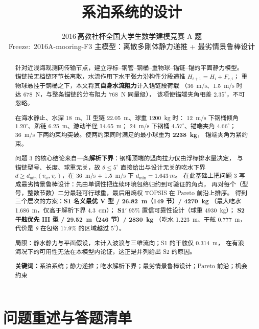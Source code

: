 \documentclass[UTF8,a4paper,zihao=-4]{ctexart}
\title{\textbf{系泊系统的设计}}
\author{
  2016\,高教社杯全国大学生数学建模竞赛 A 题\\[0.4em]
  \small Freeze:~2016A-mooring-F3\quad
  主模型：离散多刚体静力递推 + 最劣情景鲁棒设计
}
\date{}
\begin{document}
\maketitle
\thispagestyle{empty}

\begin{abstract}
针对近浅海观测网传输节点，建立浮标--钢管--钢桶--重物球--锚链--锚的平面静力模型。
锚链按无档链环节长离散，水流作用下水平张力沿构件分段递推 \(H_{i+1}=H_i+F_{c,i}\)；
重物球悬挂于钢桶之下，本文将其\textbf{自身水流阻力}计入锚链段荷载
（\SI{36}{m/s}、\SI{1.5}{m/s} 时达 \SI{678}{N}，与整条锚链的分布阻力 \SI{768}{N} 同量级），
该项使锚端夹角相差 \(2.35^\circ\)，不可忽略。

在海水静止、水深 \SI{18}{m}、II 型链 \SI{22.05}{m}、球重 \SI{1200}{kg} 时：
\SI{12}{m/s} 下钢桶倾角 \(1.20^\circ\)、趴链 \SI{6.25}{m}、游动半径 \SI{14.65}{m}；
\SI{24}{m/s} 下钢桶 \(4.57^\circ\)、锚端夹角 \(4.66^\circ\)；
\SI{36}{m/s} 下两约束均突破。使两约束同时满足的最小球重为 \textbf{\SI{2238}{kg}}，
锚端夹角为紧约束。

问题 3 的核心结论来自一条\textbf{解析下界}：钢桶顶端的竖向拉力仅由浮标排水量决定，
与锚链型号、长度、球重无关，故 \(\theta\le5^\circ\) 直接给出与设计无关的吃水下界
\(d\ge d_{\min}(v_w,v_c)\)，在 \SI{36}{m/s} + \SI{1.5}{m/s} 下 \(d_{\min}=\SI{1.643}{m}\)。
在此基础上把问题 3 写成最劣情景鲁棒设计：先由单调性把连续环境包络归约到可验证的角点，
再对每个（型号，整数节数）二分最轻可行球重，最后用熵权 TOPSIS 在 Pareto 前沿上排序。
得到三个层次的方案：\textbf{S1 名义最优 V 型 / \SI{26.82}{m}（149 节）/ \SI{4270}{kg}}
（最大吃水 \SI{1.686}{m}，仅高于解析下界 \SI{4.3}{cm}）；
\textbf{S1\('\)} 95\% 置信可靠性设计（球重 \SI{4930}{kg}）；
\textbf{S2 干舷优先 III 型 / \SI{29.52}{m}（246 节）/ \SI{2830}{kg}}
（吃水 \SI{1.223}{m}、干舷 \SI{0.777}{m}，代价是 \(\theta\) 在包络 17.9\% 的区域越过 \(5^\circ\)）。

局限：静水静力与平面假设，未计入波浪与三维流向；S1 的干舷仅 \SI{0.314}{m}，
在有浪海况下的可用性无法在本模型内论证，这正是并列给出 S2 的原因。

\vspace{0.6em}
\noindent\textbf{关键词：}系泊系统；静力递推；吃水解析下界；最劣情景鲁棒设计；Pareto 前沿；机会约束
\end{abstract}

\tableofcontents
\newpage

\section{问题重述与答题清单}
\end{document}
